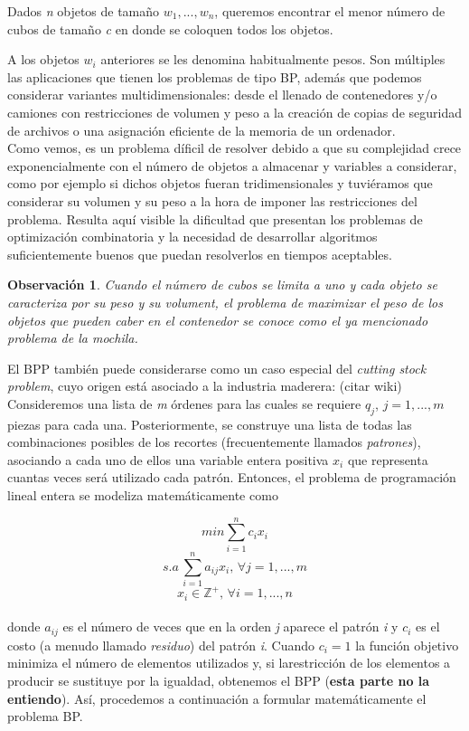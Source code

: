 \documentclass[a4paper, 12pt, oneside]{book}
\newtheorem{observacion}{Observaci\'on}[chapter]
\begin{document}
	\begin{center}
		Dados \textit{n} objetos de tama\~{n}o $w_{1},..., w_{n}$, queremos encontrar el menor n\'umero de cubos de tama\~{n}o \textit{c} en donde se coloquen todos los objetos.
	\end{center}
	
	A los objetos $w_{i}$ anteriores se les denomina habitualmente pesos. Son m\'ultiples las aplicaciones que tienen los problemas de tipo BP, adem\'as que podemos considerar variantes multidimensionales: desde el llenado de contenedores y/o camiones con restricciones de volumen y peso a la creaci\'on de copias de seguridad de archivos o una asignaci\'on eficiente de la memoria de un ordenador. 
	\\
	
	Como vemos, es un problema d\'ificil de resolver debido a que su complejidad crece exponencialmente con el n\'umero de objetos a almacenar y variables a considerar, como por ejemplo si dichos objetos fueran tridimensionales y tuvi\'eramos que considerar su volumen y su peso a la hora de imponer las restricciones del problema. Resulta aqu\'i visible la dificultad que presentan los problemas de optimizaci\'on combinatoria y la necesidad de desarrollar algoritmos suficientemente buenos que puedan resolverlos en tiempos aceptables.
	
	\begin{observacion}
		Cuando el n\'umero de cubos se limita a uno y cada objeto se caracteriza por su peso y su volument, el problema de maximizar el peso de los objetos que pueden caber en el contenedor se conoce como el  ya mencionado problema de la mochila.
	\end{observacion}
	
	El BPP tambi\'en puede considerarse como un caso especial del \textit{cutting stock problem}, cuyo origen est\'a asociado a la industria maderera: (citar wiki)
	\\
	
	Consideremos una lista de \textit{m} \'ordenes para las cuales se requiere $q_{j}$, $j = 1,...,m$ piezas para cada una. Posteriormente, se construye una lista de todas las combinaciones posibles de los recortes (frecuentemente llamados \textit{patrones}), asociando a cada uno de ellos una variable entera positiva $x_{i}$ que representa cuantas veces ser\'a utilizado cada patr\'on. Entonces, el problema de programaci\'on lineal entera se modeliza matem\'aticamente como
	\newpage
	
	$$ min \sum_{i=1}^{n}c_{i}x_{i} $$
	$$ s.a\, \sum_{i=1}^{n}a_{ij}x_{i},\, \forall j=1,...,m $$
	$$ x_{i}\in \mathbb{Z^{+}},\, \forall i=1,...,n $$
	\\
	donde $a_{ij}$ es el n\'umero de veces que en la orden \textit{j} aparece el patr\'on \textit{i} y $c_{i}$ es el costo (a menudo llamado \textit{residuo}) del patr\'on \textit{i}. Cuando $c_{i} = 1$ la funci\'on objetivo minimiza el n\'umero de elementos utilizados y, si larestricci\'on de los elementos a producir se sustituye por la igualdad, obtenemos el BPP (\textbf{esta parte no la entiendo}). As\'i, procedemos a continuaci\'on a formular matem\'aticamente el problema BP.
	\\
	
\end{document}
